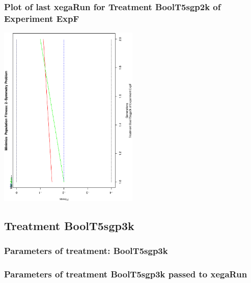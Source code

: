\documentclass[18pt,c]{beamer}
\begin{document}
 \begin{frame}
 \frametitle{ Plot of last xegaRun for Treatment BoolT5sgp2k of Experiment ExpF }
 \begin{center}
\includegraphics[width=0.5\textwidth, angle=-90]
{ExpFPlotPopStatsFigure003.eps}
 \end{center}
 \label{report/ExpFPlotPopStatsFigure003.eps}  
 \end{frame}

\clearpage
\subsection{Treatment BoolT5sgp3k}

 \begin{frame}
 \fontsize{8pt}{9pt}\selectfont
 \frametitle{  Parameters of treatment: BoolT5sgp3k 
 }

 \label{ExpFtParmTable016.tex}  
 \end{frame}


 \begin{frame}
 \fontsize{8pt}{9pt}\selectfont
 \frametitle{  Parameters of treatment BoolT5sgp3k passed to xegaRun
 }

 \label{ExpFtParmTable017.tex}  
 \end{frame}
\end{document}
